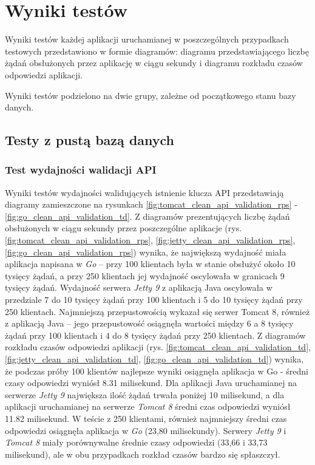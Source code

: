 \chapter{Wyniki testów}
Wyniki testów każdej aplikacji uruchamianej w poszczególnych przypadkach  testowych przedstawiono w formie diagramów: diagramu przedstawiającego liczbę żądań obsłużonych przez aplikację w ciągu sekundy i diagramu rozkładu czasów odpowiedzi aplikacji.

Wyniki testów podzielono na dwie grupy, zależne od początkowego stanu bazy danych.

\section{Testy z pustą bazą danych}

\subsection{Test wydajności walidacji API}
Wyniki testów wydajności walidujących istnienie klucza API przedstawiają diagramy zamieszczone na rysunkach \ref{fig:tomcat_clean_api_validation_rps} - \ref{fig:go_clean_api_validation_td}. 
Z diagramów prezentujących liczbę żądań obsłużonych w ciągu sekundy przez poszczególne aplikacje (rys. \ref{fig:tomcat_clean_api_validation_rps}, \ref{fig:jetty_clean_api_validation_rps}, \ref{fig:go_clean_api_validation_rps}) wynika, że największą wydajność miała aplikacja napisana w \textsl{Go} – przy 100 klientach była w stanie obsłużyć około 10 tysięcy żądań,  a przy 250 klientach jej wydajność oscylowała w granicach 9 tysięcy żądań. Wydajność serwera \textsl{Jetty 9} z aplikacją Java oscylowała w przedziale 7 do 10 tysięcy żądań przy 100 klientach i 5 do 10 tysięcy żądań przy 250 klientach. Najmniejszą przepustowością wykazał się serwer Tomcat 8, również z aplikacją Java – jego przepustowość osiągnęła wartości między 6 a 8 tysięcy żądań przy 100 klientach i 4 do 8 tysięcy żądań przy 250 klientach.   
Z diagramów rozkładu czasów odpowiedzi aplikacji (rys. \ref{fig:tomcat_clean_api_validation_td}, \ref{fig:jetty_clean_api_validation_td}, \ref{fig:go_clean_api_validation_td}) wynika, że podczas próby 100 klientów najlepsze wyniki osiągnęła aplikacja  w Go - średni czasy odpowiedzi wyniósł 8.31 milisekund. Dla aplikacji Java uruchamianej na serwerze \textsl{Jetty 9} największa ilość żądań trwała poniżej 10 milisekund, a dla aplikacji uruchamianej na serwerze \textsl{Tomcat 8} średni czas odpowiedzi wyniósł 11.82 milisekund. W teście z 250 klientami, również najmniejszy średni czas odpowiedzi osiągnęła aplikacja  w \textsl{Go} (23,80 milisekundy).  Serwery \textsl{Jetty 9} i \textsl{Tomcat 8} miały porównywalne średnie czasy odpowiedzi (33,66 i 33,73 milisekund), ale w obu przypadkach rozkład czasów bardzo się spłaszczył. 

